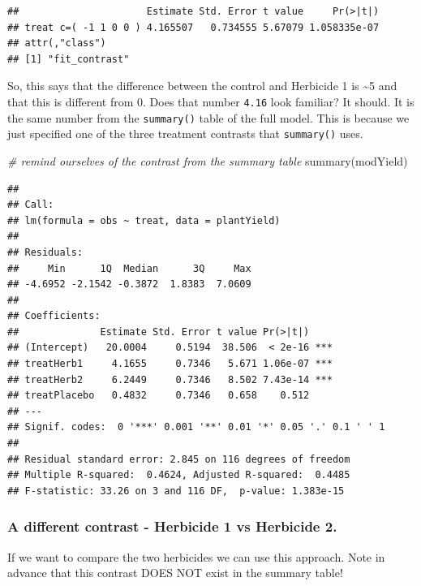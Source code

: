 \documentclass[
]{book}
\newenvironment{Shaded}{\begin{snugshade}}{\end{snugshade}}
\newcommand{\CommentTok}[1]{\textcolor[rgb]{0.56,0.35,0.01}{\textit{#1}}}
\newcommand{\FunctionTok}[1]{\textcolor[rgb]{0.00,0.00,0.00}{#1}}
\newcommand{\NormalTok}[1]{#1}
\begin{document}
\begin{verbatim}
##                      Estimate Std. Error t value     Pr(>|t|)
## treat c=( -1 1 0 0 ) 4.165507   0.734555 5.67079 1.058335e-07
## attr(,"class")
## [1] "fit_contrast"
\end{verbatim}

So, this says that the difference between the control and Herbicide 1 is \textasciitilde5 and that this is different from 0. Does that number \texttt{4.16} look familiar? It should. It is the same number from the \texttt{summary()} table of the full model. This is because we just specified one of the three treatment contrasts that \texttt{summary()} uses.

\begin{Shaded}
\begin{Highlighting}[]
\CommentTok{\# remind ourselves of the contrast from the summary table}
\FunctionTok{summary}\NormalTok{(modYield)}
\end{Highlighting}
\end{Shaded}

\begin{verbatim}
## 
## Call:
## lm(formula = obs ~ treat, data = plantYield)
## 
## Residuals:
##     Min      1Q  Median      3Q     Max 
## -4.6952 -2.1542 -0.3872  1.8383  7.0609 
## 
## Coefficients:
##              Estimate Std. Error t value Pr(>|t|)    
## (Intercept)   20.0004     0.5194  38.506  < 2e-16 ***
## treatHerb1     4.1655     0.7346   5.671 1.06e-07 ***
## treatHerb2     6.2449     0.7346   8.502 7.43e-14 ***
## treatPlacebo   0.4832     0.7346   0.658    0.512    
## ---
## Signif. codes:  0 '***' 0.001 '**' 0.01 '*' 0.05 '.' 0.1 ' ' 1
## 
## Residual standard error: 2.845 on 116 degrees of freedom
## Multiple R-squared:  0.4624, Adjusted R-squared:  0.4485 
## F-statistic: 33.26 on 3 and 116 DF,  p-value: 1.383e-15
\end{verbatim}

\hypertarget{a-different-contrast---herbicide-1-vs-herbicide-2.}{%
\subsubsection{A different contrast - Herbicide 1 vs Herbicide 2.}\label{a-different-contrast---herbicide-1-vs-herbicide-2.}}

If we want to compare the two herbicides we can use this approach. Note in advance that this contrast DOES NOT exist in the summary table!
\end{document}
